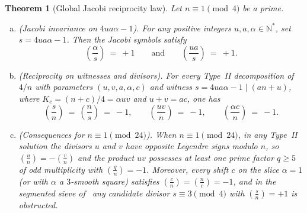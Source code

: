 \documentclass[11pt, a4paper]{article}
\theoremstyle{plain}
\newtheorem{theorem}{Theorem}[section]
\theoremstyle{definition}
\newcommand{\N}{\mathbb{N}}
\newcommand{\leg}[2]{\left(\frac{#1}{#2}\right)}
\begin{document}
\begin{theorem}[Global Jacobi reciprocity law]\label{thm:global_jacobi_reciprocity}
Let $n\equiv1\pmod 4$ be a prime.
\begin{enumerate}[(a)]
    \item \emph{(Jacobi invariance on $4ua\alpha-1$).} For any positive integers $u,a,\alpha\in\N^{\ast}$, set $s=4ua\alpha-1$. Then the Jacobi symbols satisfy
    \begin{equation}\label{eq:jacobi_invariance}
    \leg{\alpha}{s}\ =\ +1\qquad\text{and}\qquad\leg{ua}{s}\ =\ +1.
    \end{equation}
    \item \emph{(Reciprocity on witnesses and divisors).} For every Type~II decomposition of $4/n$ with parameters $(u,v,a,\alpha,c)$ and witness $s=4ua\alpha-1\mid(an+u)$, where $K_c=(n+c)/4=\alpha uv$ and $u+v=ac$, one has
    \begin{equation}\label{eq:global_reciprocity_signs}
    \leg{s}{n}\ =\ \leg{n}{s}\ =\ -1,\qquad \leg{uv}{n}\ =\ -1,\qquad \leg{\alpha c}{n}\ =\ -1.
    \end{equation}
    \item \emph{(Consequences for $n\equiv1\pmod{24}$).} When $n\equiv1\pmod{24}$, in any Type~II solution the divisors $u$ and $v$ have opposite Legendre signs modulo $n$, so $\leg{u}{n}=-\leg{v}{n}$ and the product $uv$ possesses at least one prime factor $q\ge5$ of odd multiplicity with $\leg{q}{n}=-1$. Moreover, every shift $c$ on the slice $\alpha=1$ (or with $\alpha$ a $3$-smooth square) satisfies $\leg{c}{n}=\leg{n}{c}=-1$, and in the segmented sieve of~\cite[Alg.~2]{dahan2026a} any candidate divisor $s\equiv3\pmod 4$ with $\leg{s}{n}=+1$ is obstructed.
\end{enumerate}
\end{theorem}
\end{document}
